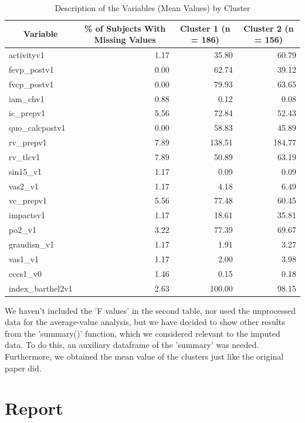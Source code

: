 \documentclass[a4paper,10pt]{article}\usepackage[]{graphicx}\usepackage[]{xcolor}
\begin{document}
\begin{table}[ht]
\centering
\begingroup\footnotesize
\begin{tabular}{lrrr}
  \hline
\multicolumn{1}{c}{\bf Variable} & \multicolumn{1}{c}{\bf \% of Subjects With Missing Values} & \multicolumn{1}{c}{\bf Cluster 1 (n = 186)} & \multicolumn{1}{c}{\bf Cluster 2 (n = 156)} \\ 
  \hline
activityv1 & 1.17 & 35.80 & 60.79 \\ 
  fevp\_postv1 & 0.00 & 62.74 & 39.12 \\ 
  fvcp\_postv1 & 0.00 & 79.93 & 63.65 \\ 
  iam\_chv1 & 0.88 & 0.12 & 0.08 \\ 
  ic\_prepv1 & 5.56 & 72.84 & 52.43 \\ 
  quo\_calcpostv1 & 0.00 & 58.83 & 45.89 \\ 
  rv\_prepv1 & 7.89 & 138.51 & 184.77 \\ 
  rv\_tlcv1 & 7.89 & 50.89 & 63.19 \\ 
  sin15\_v1 & 1.17 & 0.09 & 0.09 \\ 
  vas2\_v1 & 1.17 & 4.18 & 6.49 \\ 
  vc\_prepv1 & 5.56 & 77.48 & 60.45 \\ 
  impactsv1 & 1.17 & 18.61 & 35.81 \\ 
  po2\_v1 & 3.22 & 77.39 & 69.67 \\ 
  graudisn\_v1 & 1.17 & 1.91 & 3.27 \\ 
  vas1\_v1 & 1.17 & 2.00 & 3.98 \\ 
  cccs1\_v0 & 1.46 & 0.15 & 0.18 \\ 
  index\_barthel2v1 & 2.63 & 100.00 & 98.15 \\ 
   \hline
\end{tabular}
\endgroup
\caption{Description of the Variables (Mean Values) by Cluster} 
\label{tab:descr}
\end{table}


We haven't included the 'F values' in the second table, nor used
the unprocessed data for the average-value analysis, but we have decided to
show other results from the 'summary()' function, which we considered relevant
to the imputed data. To do this, an auxiliary dataframe of the 'summary' was
needed. Furthermore, we obtained the mean value of the clusters just like the 
original paper did.

\section{Report}
\end{document}
